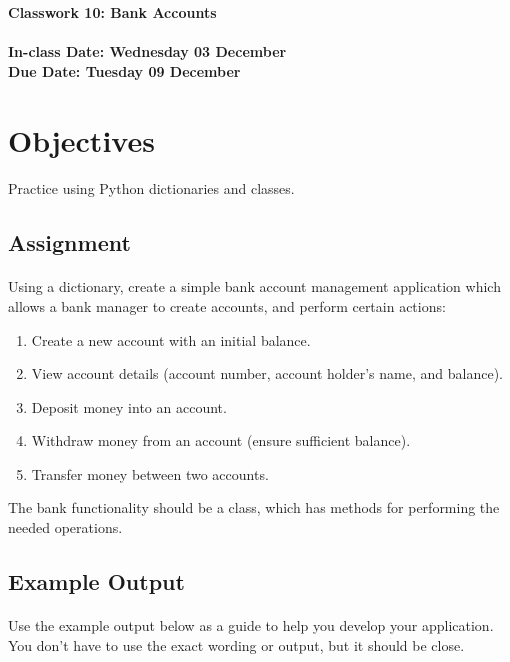 \documentclass[letter,10pt]{article}
\begin{document}
    
    \huge
    \textbf{Classwork 10: Bank Accounts}
    \normalsize
    \\ ~~ \\
    \textbf{In-class Date: Wednesday 03 December} \\
    \textbf{Due Date: Tuesday 09 December}
    
    \section*{Objectives}
    \paragraph{}Practice using Python dictionaries and classes.
    
    \subsection*{Assignment}
    \paragraph{}Using a dictionary, create a simple bank account management application which allows a bank manager to create accounts, and perform certain actions:
    \begin{enumerate}
        \item Create a new account with an initial balance.
        \item View account details (account number, account holder's name, and balance).
        \item Deposit money into an account.
        \item Withdraw money from an account (ensure sufficient balance).
        \item Transfer money between two accounts.
    \end{enumerate}
    
    The bank functionality should be a class, which has methods for performing the needed operations.
    
    \subsection*{Example Output}
    \paragraph{}Use the example output below as a guide to help you develop your application. You don't have to use the exact wording or output, but it should be close.
    
\end{document}
